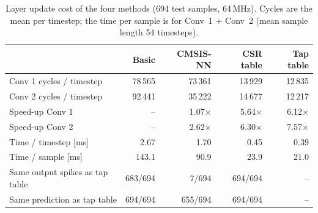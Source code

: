 \begin{table}[htbp]
\centering
\caption{Layer update cost of the four methods (694 test samples, 64\,MHz). Cycles are
the mean per timestep; the time per sample is for Conv~1 + Conv~2 (mean sample length 54 timesteps).}
\label{tab:method_comparison}
\begin{tabular}{lrrrr}
\toprule
 & Basic & CMSIS-NN & CSR table & Tap table \\
\midrule
Conv 1 cycles / timestep & 78\,565 & 73\,361 & 13\,929 & 12\,835 \\
Conv 2 cycles / timestep & 92\,441 & 35\,222 & 14\,677 & 12\,217 \\
Speed-up Conv 1 & -- & 1.07$\times$ & 5.64$\times$ & 6.12$\times$ \\
Speed-up Conv 2 & -- & 2.62$\times$ & 6.30$\times$ & 7.57$\times$ \\
Time / timestep [ms] & 2.67 & 1.70 & 0.45 & 0.39 \\
Time / sample [ms] & 143.1 & 90.9 & 23.9 & 21.0 \\
\midrule
Same output spikes as tap table & 683/694 & 7/694 & 694/694 & -- \\
Same prediction as tap table & 694/694 & 655/694 & 694/694 & -- \\
\bottomrule
\end{tabular}
\end{table}
